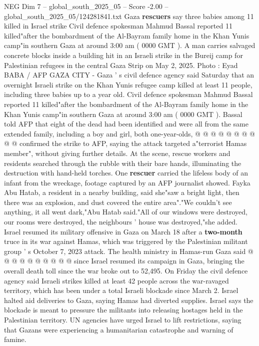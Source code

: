 \begin{textsample}{NEG Dim 7 – global\_south\_2025\_05 – Score -2.00 – global\_south\_2025\_05/124281841.txt}  \label{ex:f7_neg_010}
Gaza \textbf{rescuers} say three babies among 11 killed in Israel strike Civil defence spokesman Mahmud Bassal reported 11 killed"after the bombardment of the Al-Bayram family home in the Khan Yunis camp"in southern Gaza at around 3:00 am ( 0000 GMT ).
A man carries salvaged concrete blocks inside a building hit in an Israeli strike in the Bureij camp for Palestinian refugees in the central Gaza Strip on May 2, 2025.
Photo : Eyad BABA / AFP GAZA CITY - Gaza ' s civil defence agency said Saturday that an overnight Israeli strike on the Khan Yunis refugee camp killed at least 11 people, including three babies up to a year old.
Civil defence spokesman Mahmud Bassal reported 11 killed"after the bombardment of the Al-Bayram family home in the Khan Yunis camp"in southern Gaza at around 3:00 am ( 0000 GMT ).
Bassal told AFP that eight of the dead had been identified and were all from the same extended family, including a boy and girl, both one-year-olds, @ @ @ @ @ @ @ @ @ @ confirmed the strike to AFP, saying the attack targeted a"terrorist Hamas member", without giving further details.
At the scene, rescue workers and residents searched through the rubble with their bare hands, illuminating the destruction with hand-held torches.
One \textbf{rescuer} carried the lifeless body of an infant from the wreckage, footage captured by an AFP journalist showed.
Fayka Abu Hatab, a resident in a nearby building, said she"saw a bright light, then there was an explosion, and dust covered the entire area"."We couldn't see anything, it all went dark,"Abu Hatab said."All of our windows were destroyed, our rooms were destroyed, the neighbours ' house was destroyed,"she added.
Israel resumed its military offensive in Gaza on March 18 after a \textbf{two-month} truce in its war against Hamas, which was triggered by the Palestinian militant group ' s October 7, 2023 attack.
The health ministry in Hamas-run Gaza said @ @ @ @ @ @ @ @ @ @ since Israel resumed its campaign in Gaza, bringing the overall death toll since the war broke out to 52,495.
On Friday the civil defence agency said Israeli strikes killed at least 42 people across the war-ravaged territory, which has been under a total Israeli blockade since March 2.
Israel halted aid deliveries to Gaza, saying Hamas had diverted supplies.
Israel says the blockade is meant to pressure the militants into releasing hostages held in the Palestinian territory.
UN agencies have urged Israel to lift restrictions, saying that Gazans were experiencing a humanitarian catastrophe and warning of famine.

\end{textsample}
